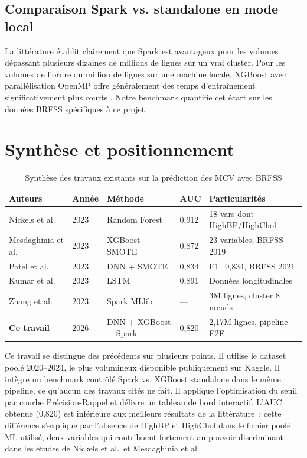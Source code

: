 \subsection{Comparaison Spark vs. standalone en mode local}

La littérature établit clairement que Spark est avantageux pour les volumes dépassant plusieurs dizaines de millions de lignes sur un vrai cluster. Pour les volumes de l'ordre du million de lignes sur une machine locale, XGBoost avec parallélisation OpenMP offre généralement des temps d'entraînement significativement plus courts \cite{shwartz2022}. Notre benchmark quantifie cet écart sur les données BRFSS spécifiques à ce projet.

\section{Synthèse et positionnement}

\begin{table}[H]
\centering
\caption{Synthèse des travaux existants sur la prédiction des MCV avec BRFSS}
\label{tab:etat_art}
\begin{tabular}{p{3.5cm}p{1.5cm}p{3cm}p{1.5cm}p{3.5cm}}
\toprule
\textbf{Auteurs} & \textbf{Année} & \textbf{Méthode} & \textbf{AUC} & \textbf{Particularités} \\
\midrule
Nickels et al. \cite{nickels2023}    & 2023 & Random Forest       & 0,912 & 18 vars dont HighBP/HighChol \\
Mesdaghinia et al. \cite{mesdaghinia2023} & 2023 & XGBoost + SMOTE & 0,872 & 23 variables, BRFSS 2019 \\
Patel et al. \cite{patel2023}        & 2023 & DNN + SMOTE         & 0,834 & F1=0,834, BRFSS 2021 \\
Kumar et al. \cite{kumar2023}        & 2023 & LSTM                & 0,891 & Données longitudinales \\
Zhang et al. \cite{zhang2023}        & 2023 & Spark MLlib         & ---   & 3M lignes, cluster 8 nœuds \\
\midrule
\textbf{Ce travail}                  & 2026 & DNN + XGBoost + Spark & 0,820 & 2,17M lignes, pipeline E2E \\
\bottomrule
\end{tabular}
\end{table}

Ce travail se distingue des précédents sur plusieurs points. Il utilise le dataset poolé
2020--2024, le plus volumineux disponible publiquement sur Kaggle. Il intègre un benchmark
contrôlé Spark vs. XGBoost standalone dans le même pipeline, ce qu'aucun des travaux
cités ne fait. Il applique l'optimisation du seuil par courbe Précision-Rappel et délivre
un tableau de bord interactif. L'AUC obtenue (0,820) est inférieure aux meilleurs résultats
de la littérature~; cette différence s'explique par l'absence de HighBP et HighChol dans le
fichier poolé ML utilisé, deux variables qui contribuent fortement au pouvoir discriminant
dans les études de Nickels et al.\ et Mesdaghinia et al.
